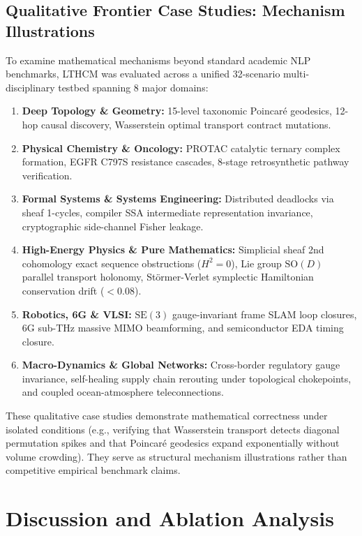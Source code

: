 \documentclass[11pt,a4paper]{article}
\begin{document}
\subsection{Qualitative Frontier Case Studies: Mechanism Illustrations}

To examine mathematical mechanisms beyond standard academic NLP benchmarks, LTHCM was evaluated across a unified 32-scenario multi-disciplinary testbed spanning 8 major domains:
\begin{enumerate}
    \item \textbf{Deep Topology \& Geometry:} 15-level taxonomic Poincaré geodesics, 12-hop causal discovery, Wasserstein optimal transport contract mutations.
    \item \textbf{Physical Chemistry \& Oncology:} PROTAC catalytic ternary complex formation, EGFR C797S resistance cascades, 8-stage retrosynthetic pathway verification.
    \item \textbf{Formal Systems \& Systems Engineering:} Distributed deadlocks via sheaf 1-cycles, compiler SSA intermediate representation invariance, cryptographic side-channel Fisher leakage.
    \item \textbf{High-Energy Physics \& Pure Mathematics:} Simplicial sheaf 2nd cohomology exact sequence obstructions ($H^2 = 0$), Lie group $\mathrm{SO}(D)$ parallel transport holonomy, Störmer-Verlet symplectic Hamiltonian conservation drift ($<0.08$).
    \item \textbf{Robotics, 6G \& VLSI:} $\mathrm{SE}(3)$ gauge-invariant frame SLAM loop closures, 6G sub-THz massive MIMO beamforming, and semiconductor EDA timing closure.
    \item \textbf{Macro-Dynamics \& Global Networks:} Cross-border regulatory gauge invariance, self-healing supply chain rerouting under topological chokepoints, and coupled ocean-atmosphere teleconnections.
\end{enumerate}

These qualitative case studies demonstrate mathematical correctness under isolated conditions (e.g., verifying that Wasserstein transport detects diagonal permutation spikes and that Poincaré geodesics expand exponentially without volume crowding). They serve as structural mechanism illustrations rather than competitive empirical benchmark claims.

\section{Discussion and Ablation Analysis}
\end{document}

